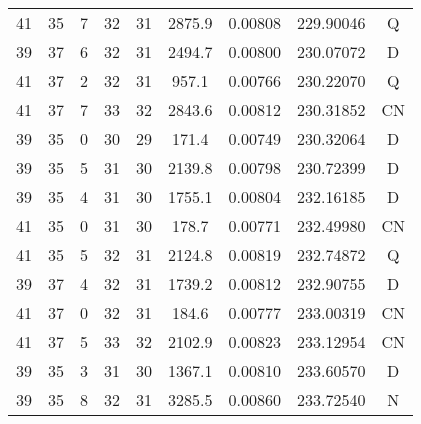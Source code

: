 \begin{table*}[htp]
\begin{tabular}{ccccccccc}
41 & 35 & 7 & 32 & 31 & 2875.9 & 0.00808 & 229.90046 & Q \\
39 & 37 & 6 & 32 & 31 & 2494.7 & 0.00800 & 230.07072 & D \\
41 & 37 & 2 & 32 & 31 & 957.1 & 0.00766 & 230.22070 & Q \\
41 & 37 & 7 & 33 & 32 & 2843.6 & 0.00812 & 230.31852 & CN \\
39 & 35 & 0 & 30 & 29 & 171.4 & 0.00749 & 230.32064 & D \\
39 & 35 & 5 & 31 & 30 & 2139.8 & 0.00798 & 230.72399 & D \\
39 & 35 & 4 & 31 & 30 & 1755.1 & 0.00804 & 232.16185 & D \\
41 & 35 & 0 & 31 & 30 & 178.7 & 0.00771 & 232.49980 & CN \\
41 & 35 & 5 & 32 & 31 & 2124.8 & 0.00819 & 232.74872 & Q \\
39 & 37 & 4 & 32 & 31 & 1739.2 & 0.00812 & 232.90755 & D \\
41 & 37 & 0 & 32 & 31 & 184.6 & 0.00777 & 233.00319 & CN \\
41 & 37 & 5 & 33 & 32 & 2102.9 & 0.00823 & 233.12954 & CN \\
39 & 35 & 3 & 31 & 30 & 1367.1 & 0.00810 & 233.60570 & D \\
39 & 35 & 8 & 32 & 31 & 3285.5 & 0.00860 & 233.72540 & N \\
\hline
\end{tabular}

\par 
\end{table*}
